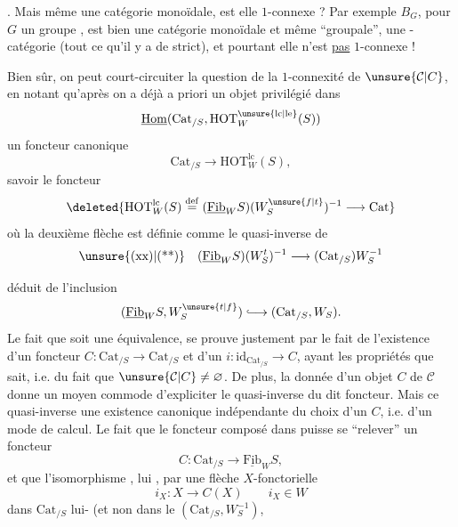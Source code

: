 . Mais même une catégorie monoïdale, est elle $1$-connexe ? Par exemple $B_G$, pour $G$ un groupe , est bien une catégorie monoïdale et même ``groupale'', une -catégorie (tout ce qu'il y a de strict), et pourtant elle n'est \uline{pas} $1$-connexe !

Bien sûr, on peut court-circuiter la question de la $1$-connexité de $\unsure{\mathcal{C}|C}$, en notant qu'après   on a déjà a priori un objet privilégié dans
\[
\underline{\mathrm{Hom}}(\mathrm{Cat}_{/S},\mathrm{HOT}_{W}^{\unsure{\mathrm{lc}|\mathrm{le}}}(S))
\]
 un foncteur canonique
\[
\mathrm{Cat}_{/S}\longrightarrow\mathrm{HOT}_{W}^{\mathrm{lc}}(S),
\]
savoir  le foncteur  
\[
\deleted{\mathrm{HOT}^{\mathrm{lc}}_W(S)\overset{\mathrm{def}}{=}(\underline{\mathrm{Fib}}_W S)(W_S^{\unsure{f|t}})^{-1}\longrightarrow\mathrm{Cat}}
\]
où la deuxième flèche est définie comme le quasi-inverse de
\[
\text{\unsure{(xx)|(**)}}\quad(\underline{\mathrm{Fib}}_W S)(W_S^{t})^{-1}\longrightarrow(\mathrm{Cat}_{/S})W_S^{-1}
\]

déduit de l'inclusion
\[
(\underline{\mathrm{Fib}}_W S,W_S^{\unsure{t|f}})\lhook\joinrel\longrightarrow(\mathrm{Cat}_{/S},W_S).
\]
Le fait que  soit une équivalence, se prouve justement par le fait de l'existence d'un foncteur $C:\mathrm{Cat}_{/S}\to\mathrm{Cat}_{/S}$ et d'un $i:\mathrm{id}_{\mathrm{Cat}_{/S}}\to C$, ayant les propriétés que  sait, i.e. du fait que $\unsure{\mathcal{C}|C}\ne\varnothing$. De plus, la donnée d'un objet $C$ de $\mathcal{C}$ donne un moyen commode d'expliciter le quasi-inverse du dit foncteur. Mais ce quasi-inverse  une existence canonique  indépendante du choix d'un $C$, i.e. d'un mode de calcul. Le fait que le foncteur composé \inserted{$\unsure{\varphi|\phi}$} dans  puisse se ``relever''   un foncteur
\[
C:\mathrm{Cat}_{/S}\longrightarrow\underline{\mathrm{Fib}}_W S,
\]
et que l'isomorphisme   , lui , par une flèche $X$-fonctorielle
\[
i_X:X\longrightarrow C(X)\qquad i_X\in W
\]
dans $\mathrm{Cat}_{/S}$ lui- (et non  dans le  $(\mathrm{Cat}_{/S},W_S^{-1})$,

